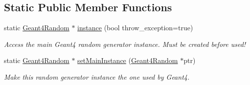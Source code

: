 \subsection*{Static Public Member Functions}
\begin{DoxyCompactItemize}
\item 
static \hyperlink{class_d_d4hep_1_1_simulation_1_1_geant4_random}{Geant4Random} $\ast$ \hyperlink{class_d_d4hep_1_1_simulation_1_1_geant4_random_a76e4bbadf0c58d9f6ee05decdd200fe6}{instance} (bool throw\_\-exception=true)
\begin{DoxyCompactList}\small\item\em Access the main Geant4 random generator instance. Must be created before used! \item\end{DoxyCompactList}\item 
static \hyperlink{class_d_d4hep_1_1_simulation_1_1_geant4_random}{Geant4Random} $\ast$ \hyperlink{class_d_d4hep_1_1_simulation_1_1_geant4_random_a544fa42f6ae0d64697e366da5e1297b2}{setMainInstance} (\hyperlink{class_d_d4hep_1_1_simulation_1_1_geant4_random}{Geant4Random} $\ast$ptr)
\begin{DoxyCompactList}\small\item\em Make this random generator instance the one used by Geant4. \item\end{DoxyCompactList}\end{DoxyCompactItemize}
